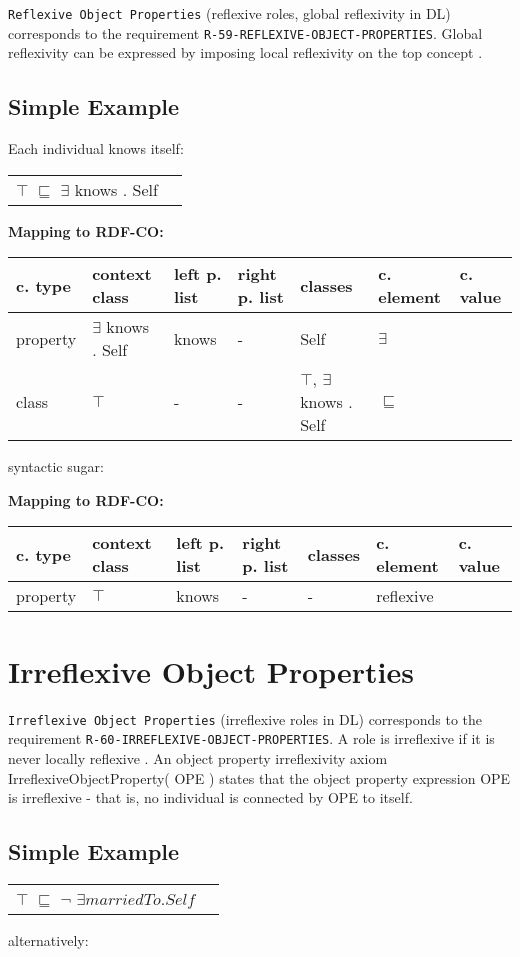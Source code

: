 \documentclass{llncs}
\newcommand{\ms}[1]{\texttt{#1}}
\newenvironment{gcotable}{
  \scriptsize
  \sffamily
  \vspace{0cm}
	\begin{center}
	\textbf{\vspace{0.4cm}Mapping to RDF-CO:} \\
  \begin{tabular}{l|l|l|l|l|l|l}
	\hline
  \textbf{c. type} & \textbf{context class} & \textbf{left p. list} & \textbf{right p. list} & \textbf{classes} & \textbf{c. element} & \textbf{c. value} \\
  \hline

}{
  \hline
  \end{tabular}
	\end{center}
}
\newenvironment{DL}{
  \vspace{0cm}
	\begin{center}
  \begin{tabular}{r l}

}{
  \end{tabular}
	\end{center}
}
\begin{document}
\ms{Reflexive Object Properties} (reflexive roles, global reflexivity in DL) corresponds to the requirement \ms{R-59-REFLEXIVE-OBJECT-PROPERTIES}.
Global reflexivity can be expressed by imposing local reflexivity on the top concept \cite{Kroetzsch2012}.

\subsection{Simple Example}

Each individual knows itself:

\begin{DL}
$\top$ $\sqsubseteq$ $\exists$ knows . Self
\end{DL}

\begin{gcotable}
property & $\exists$ knows . Self & knows & - & Self & $\exists$ \\
class & $\top$ & - & - & $\top$, $\exists$ knows . Self & $\sqsubseteq$ \\
\end{gcotable}

syntactic sugar:

\begin{gcotable}
property & $\top$ & knows & - & - & reflexive \\
\end{gcotable}

\section{Irreflexive Object Properties}

\ms{Irreflexive Object Properties} (irreflexive roles in DL) corresponds to the requirement \ms{R-60-IRREFLEXIVE-OBJECT-PROPERTIES}.
A role is irreflexive if it is never locally reflexive \cite{Kroetzsch2012}.
An object property irreflexivity axiom IrreflexiveObjectProperty( OPE ) states that the object property expression OPE is irreflexive - that is, no individual is connected by OPE to itself. 

\subsection{Simple Example}

\begin{DL}
$\top$ $\sqsubseteq$ $\neg$ $\exists  marriedTo . Self$ 
\end{DL}

alternatively:
\end{document}
